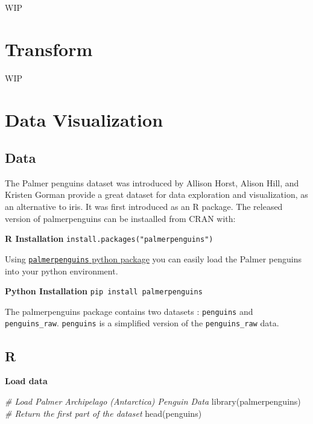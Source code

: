 \documentclass[
]{book}
\newenvironment{Shaded}{\begin{snugshade}}{\end{snugshade}}
\newcommand{\CommentTok}[1]{\textcolor[rgb]{0.56,0.35,0.01}{\textit{#1}}}
\newcommand{\FunctionTok}[1]{\textcolor[rgb]{0.00,0.00,0.00}{#1}}
\newcommand{\NormalTok}[1]{#1}
\begin{document}
WIP

\hypertarget{transform}{%
\chapter{Transform}\label{transform}}

WIP

\hypertarget{data-visualization}{%
\chapter{Data Visualization}\label{data-visualization}}

\hypertarget{data}{%
\section{Data}\label{data}}

The Palmer penguins dataset was introduced by Allison Horst, Alison Hill, and Kristen Gorman provide a great dataset for data exploration and visualization, as an alternative to iris. It was first introduced as an R package. The released version of palmerpenguins can be instaalled from CRAN with:

\textbf{R Installation}
\texttt{install.packages("palmerpenguins")}

Using \href{https://pypi.org/project/palmerpenguins/}{\texttt{palmerpenguins} python package} you can easily load the Palmer penguins into your python environment.

\textbf{Python Installation}
\texttt{pip\ install\ palmerpenguins}

The palmerpenguins package contains two datasets : \texttt{penguins} and \texttt{penguins\_raw}. \texttt{penguins} is a simplified version of the \texttt{penguins\_raw} data.

\hypertarget{r-5}{%
\section{R}\label{r-5}}

\textbf{Load data}

\begin{Shaded}
\begin{Highlighting}[]
\CommentTok{\# Load Palmer Archipelago (Antarctica) Penguin Data}
\FunctionTok{library}\NormalTok{(palmerpenguins)}
\CommentTok{\# Return the first part of the dataset}
\FunctionTok{head}\NormalTok{(penguins)}
\end{Highlighting}
\end{Shaded}
\end{document}

